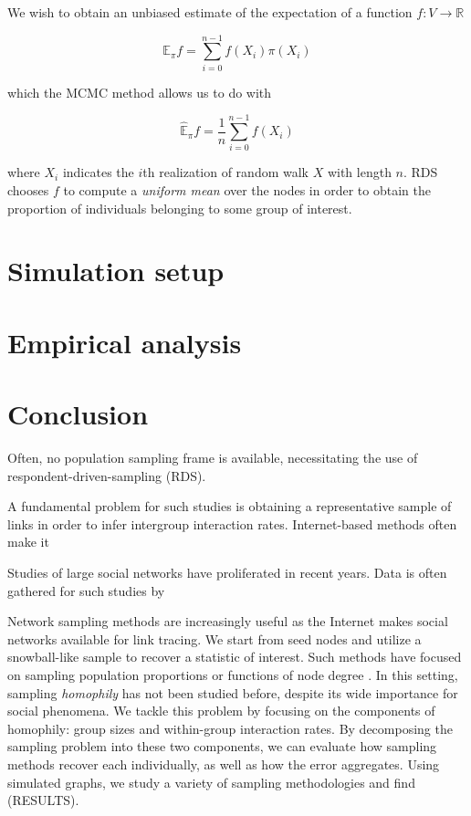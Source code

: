 \documentclass[a4paper]{article}
\begin{document}
We wish to obtain an unbiased estimate of the expectation of a function $f: V \to \mathbb{R}$

\begin{equation}
\mathbb{E}_\pi f = \sum_{i = 0}^{n-1} f(X_i) \pi(X_i)
\end{equation}

\noindent
which the MCMC method allows us to do with

\begin{equation}
\hat{\mathbb{E}}_\pi f = \frac{1}{n} \sum_{i = 0}^{n-1} f(X_i)
\end{equation}

\noindent
where $X_i$ indicates the $i$th realization of random walk $X$ with length $n$. RDS chooses $f$ to compute a \emph{uniform mean} over the nodes in order to obtain the proportion of individuals belonging to some group of interest.

\section{Simulation setup}

\section{Empirical analysis}

\section{Conclusion}


Often, no population sampling frame is available, necessitating the use of respondent-driven-sampling (RDS).


A fundamental problem for such studies is obtaining a representative sample of links in order to infer intergroup interaction rates. Internet-based methods often make it

Studies of large social networks have proliferated in recent years. Data is often gathered for such studies by

Network sampling methods are increasingly useful as the Internet makes social networks available for link tracing. We start from seed nodes and utilize a snowball-like sample to recover a statistic of interest. Such methods have focused on sampling population proportions \cite{heckathorn_respondent-driven_2002} or functions of node degree \cite{karimi_visibility_2017}. In this setting, sampling \emph{homophily} \cite{currarini_economic_2009} has not been studied before, despite its wide importance for social phenomena. We tackle this problem by focusing on the components of homophily: group sizes and within-group interaction rates. By decomposing the sampling problem into these two components, we can evaluate how sampling methods recover each individually, as well as how the error aggregates. Using simulated graphs, we study a variety of sampling methodologies and find (RESULTS).
\end{document}
